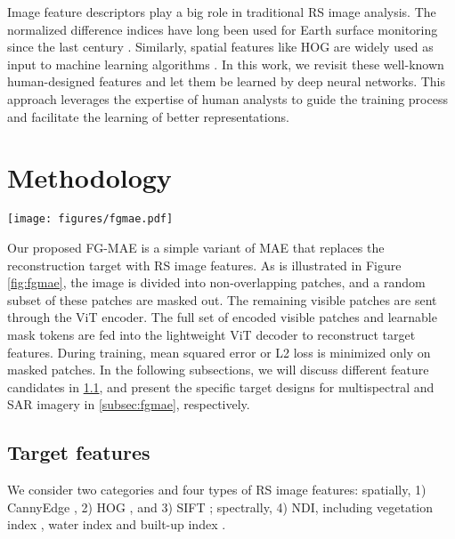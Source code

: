 \documentclass[lettersize,journal]{IEEEtran}
\begin{document}
\vspace{0.5em}
 \hspace{0.3em}
Image feature descriptors play a big role in traditional RS image analysis. The normalized difference indices have long been used for Earth surface monitoring since the last century \cite{carlson1997relation,gao1996ndwi}. Similarly, spatial features like HOG are widely used as input to machine learning algorithms \cite{torrione2013histograms}. In this work, we revisit these well-known human-designed features and let them be learned by deep neural networks. This approach leverages the expertise of human analysts to guide the training process and facilitate the learning of better representations.







\vspace{-0.3em}
\section{Methodology}
\label{sec:methodology}

\begin{figure*}[ht]
  \centering
  \texttt{[image: figures/fgmae.pdf]}
  \caption{The general structure of the proposed FG-MAE method. We replace the reconstruction target of MAE \cite{he2022masked} by remote sensing image features.}
  \label{fig:fgmae}
\vspace{-1em}
\end{figure*}

Our proposed FG-MAE is a simple variant of MAE \cite{he2022masked} that replaces the reconstruction target with RS image features. As is illustrated in Figure \ref{fig:fgmae}, the image is divided into non-overlapping patches, and a random subset of these patches are masked out. The remaining visible patches are sent through the ViT encoder. The full set of encoded visible patches and learnable mask tokens are fed into the lightweight ViT decoder to reconstruct target features. During training, mean squared error or L2 loss is minimized only on masked patches. In the following subsections, we will discuss different feature candidates in \ref{subsec:feature}, and present the specific target designs for multispectral and SAR imagery in \ref{subsec:fgmae}, respectively.

\vspace{-0.3em}
\subsection{Target features}
\label{subsec:feature}
We consider two categories and four types of RS image features: spatially, 1) CannyEdge \cite{canny1986computational}, 2) HOG \cite{dalal2005histograms}, and 3) SIFT \cite{lowe2004distinctive}; spectrally, 4) NDI, including vegetation index \cite{pettorelli2013normalized}, water index \cite{gao1996ndwi} and built-up index \cite{zha2003use}.
\end{document}

